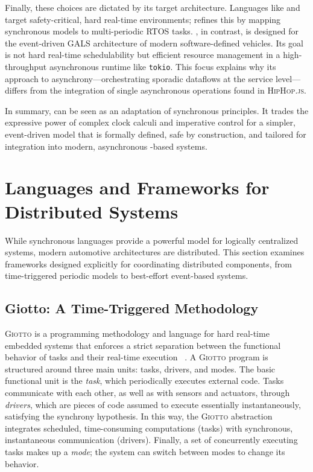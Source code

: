 Finally, these choices are dictated by its target architecture. Languages like \Lustre and \Esterel
target safety-critical, hard real-time environments; \Prelude refines this by mapping synchronous
models to multi-periodic RTOS tasks. \GRust, in contrast, is designed for the event-driven GALS
architecture of modern software-defined vehicles. Its goal is not hard real-time schedulability but
efficient resource management in a high-throughput asynchronous runtime like \texttt{tokio}. This
focus explains why its approach to asynchrony---orchestrating sporadic dataflows at the service
level---differs from the integration of single asynchronous operations found in \textsc{HipHop.js}.

In summary, \GRust can be seen as an adaptation of synchronous principles. It trades the expressive
power of complex clock calculi and imperative control for a simpler, event-driven model that is
formally defined, safe by construction, and tailored for integration into modern, asynchronous
\Rust-based systems.

\section{Languages and Frameworks for Distributed Systems}
\label{sec:sota:distributed}

While synchronous languages provide a powerful model for logically centralized systems, modern
automotive architectures are distributed. This section examines frameworks designed explicitly for
coordinating distributed components, from time-triggered periodic models to best-effort event-based
systems.

\subsection{Giotto: A Time-Triggered Methodology}
\label{sec:sota:distributed:giotto}

\textsc{Giotto} is a programming methodology and language for hard real-time embedded systems that
enforces a strict separation between the functional behavior of tasks and their real-time execution%
~\cite{DBLP:journals/pieee/HenzingerHK03}. A \textsc{Giotto} program is structured around three main
units: tasks, drivers, and modes. The basic functional unit is the \emph{task}, which periodically
executes external code. Tasks communicate with each other, as well as with sensors and actuators,
through \emph{drivers}, which are pieces of code assumed to execute essentially instantaneously,
satisfying the synchrony hypothesis. In this way, the \textsc{Giotto} abstraction integrates
scheduled, time-consuming computations (tasks) with synchronous, instantaneous communication
(drivers). Finally, a set of concurrently executing tasks makes up a \emph{mode}; the system can
switch between modes to change its behavior.

